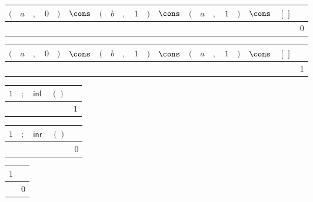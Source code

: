 {\scriptsize\setlength{\tabcolsep}{1.5pt}%
\begin{tabular}{ccccccccccccccccccc|l}
$($ & $a$ & $,$ & $0$ & $)$ & $\cons$ & $($ & $b$ & $,$ & $1$ & $)$ & $\cons$ & $($ & $a$ & $,$ & $1$ & $)$ & $\cons$ & $[\,]$ & \\ \hline
\gcell{$$} & \gcell{$$} & \gcell{$$} & \gcell{$$} & \gcell{$$} & \gcell{$\posC{\circ}$} & \gcell{$$} & \gcell{$$} & \gcell{$$} & \gcell{$$} & \gcell{$$} & \gcell{$$} & \gcell{$$} & \gcell{$$} & \gcell{$$} & \gcell{$$} & \gcell{$$} & \gcell{$$} & \gcell{$$} & $0$ \\
\end{tabular}}
{\scriptsize\setlength{\tabcolsep}{1.5pt}%
\begin{tabular}{ccccccccccccccccccc|l}
$($ & $a$ & $,$ & $0$ & $)$ & $\cons$ & $($ & $b$ & $,$ & $1$ & $)$ & $\cons$ & $($ & $a$ & $,$ & $1$ & $)$ & $\cons$ & $[\,]$ & \\ \hline
\gcell{$$} & \gcell{$$} & \gcell{$$} & \gcell{$$} & \gcell{$$} & \gcell{$\posC{\circ}$} & \gcell{$$} & \gcell{$$} & \gcell{$$} & \gcell{$$} & \gcell{$$} & \gcell{$$} & \gcell{$$} & \gcell{$$} & \gcell{$$} & \gcell{$$} & \gcell{$$} & \gcell{$$} & \gcell{$$} & $1$ \\
\end{tabular}}
{\scriptsize\setlength{\tabcolsep}{1.5pt}%
\begin{tabular}{cccc|l}
$1$ & $;$ & $\mathsf{inl}\,$ & $()$ & \\ \hline
\gcell{$\posD{\bullet}$} & \gcell{$$} & \gcell{$\posC{\circ}$} & \gcell{$$} & $1$ \\
\end{tabular}}
{\scriptsize\setlength{\tabcolsep}{1.5pt}%
\begin{tabular}{cccc|l}
$1$ & $;$ & $\mathsf{inr}\,$ & $()$ & \\ \hline
\gcell{$$} & \gcell{$$} & \gcell{$\posC{\circ}$} & \gcell{$$} & $0$ \\
\end{tabular}}
{\scriptsize\setlength{\tabcolsep}{1.5pt}%
\begin{tabular}{c|l}
$1$ & \\ \hline
\gcell{$\posC{\circ}$} & $0$ \\
\end{tabular}}
